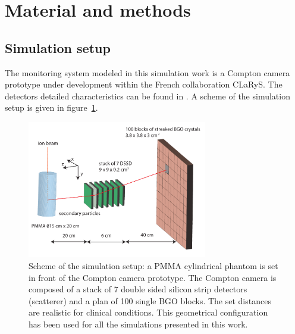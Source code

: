 
\section{Material and methods}

\subsection{Simulation setup}

The monitoring system modeled in this simulation work is a Compton camera prototype under development within the French collaboration CLaRyS. The detectors detailed characteristics can be found in \cite{krimmer:hal-01101334}. A scheme of the simulation setup is given in figure~\ref{fig:fig_setup_CC_simulation_Hadronth}.

\begin{figure} [!hbtp]	
  \centering
  \includegraphics[width=0.7\textwidth]{./Figure/Compton_Camera_hadontherapy_PMMA_Cylinder_EN.pdf}
  \caption{Scheme of the simulation setup: a PMMA cylindrical phantom is set in front of the Compton camera prototype. The Compton camera is composed of a stack of 7 double sided silicon strip detectors (scatterer) and a plan of 100 single BGO blocks. The set distances are realistic for clinical conditions. This geometrical configuration has been used for all the simulations presented in this work.}
  \label{fig:fig_setup_CC_simulation_Hadronth}
\end{figure}

